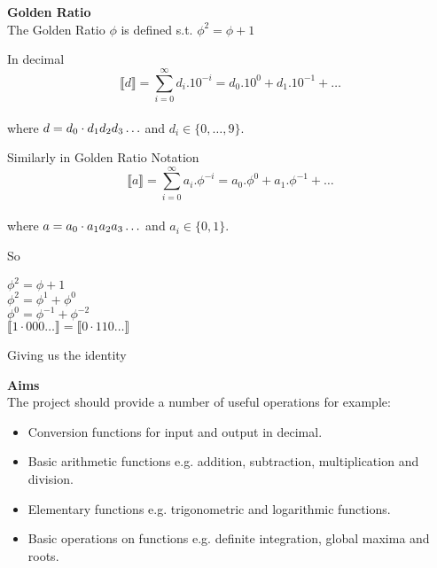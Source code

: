 \documentclass{csslides}\raggedright
\begin{document}
\begin{slide}{}
{\bf Golden Ratio} \\
The Golden Ratio $\phi$ is defined s.t. $\phi^{2}=\phi+1$

In decimal
\[ \llbracket d \rrbracket = \sum_{i=0}^{\infty} d_{i}.10^{-i} = d_{0}.10^{0} + d_{1}.10^{-1} + \ldots \] \\
where \(d=d_{0}\/\cdot\/ d_{1} d_{2} d_{3} \ldots\) and \(d_{i} \in \{0, \ldots,9\}.\)

Similarly in Golden Ratio Notation
\[ \llbracket a \rrbracket =\sum_{i=0}^{\infty} a_{i}.\phi^{-i} = a_{0}.\phi^{0} + a_{1}.\phi^{-1} + \ldots \] \\
 where \(a=a_{0}\/\cdot\/a_{1} a_{2} a_{3} \ldots\) and \(a_{i} \in \{0, 1\}.\)

So
\begin{center}
\( \phi^{2} = \phi + 1                          \) \\
\( \phi^{2} = \phi^{1} + \phi^{0}                       \) \\
\( \phi^{0} = \phi^{-1} + \phi^{-2}                     \) \\
\( \llbracket 1 \cdot 000 \ldots \rrbracket = \llbracket 0 \cdot 110 \ldots \rrbracket \) \\
\end{center}
Giving us the identity \\
\begin{center}
\framebox{$\llbracket 100 \rrbracket = \llbracket 011 \rrbracket$ }
\end{center}
\end{slide}

\begin{slide}{}
\vfill
{\bf Aims} \\
The project should provide a number of useful operations for example:
\begin{itemize}
\item Conversion functions for input and output in decimal.
\item Basic arithmetic functions e.g.  addition, subtraction, multiplication and division.
\item Elementary functions e.g.  trigonometric and logarithmic functions.
\item Basic operations on functions e.g.  definite integration, global maxima and roots.
\end{itemize}
\vfill
\end{slide}
                                                                                                                                                                    
\end{document}
